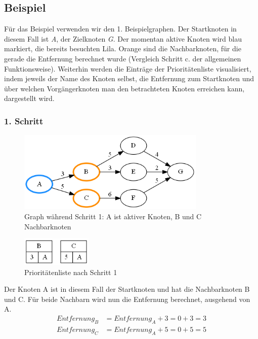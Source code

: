 \documentclass[11pt]{scrreprt}
\begin{document}
		\newpage
		\subsection{Beispiel}
		Für das Beispiel verwenden wir den 1. Beispielgraphen. Der Startknoten in diesem Fall ist \textit{A}, der Zielknoten \textit{G}. Der momentan aktive Knoten wird blau markiert, die bereits besuchten Lila. Orange sind die Nachbarknoten, für die gerade die Entfernung berechnet wurde (Vergleich Schritt c. der allgemeinen Funktionsweise).
		Weiterhin werden die Einträge der Prioritätenliste visualisiert, indem jeweils der Name des Knoten selbst, die Entfernung zum Startknoten und über welchen Vorgängerknoten man den betrachteten Knoten erreichen kann, dargestellt wird.
			\subsubsection{1. Schritt}
			\begin{figure}[ht]
				\centering
				\includegraphics[width=0.8\textwidth]{Graphs/Example1}
				\caption{Graph während Schritt 1: A ist aktiver Knoten, B und C Nachbarknoten}
			\end{figure}
			\begin{figure}[ht!]
				\centering
				\includegraphics[width=0.3\textwidth]{Graphs/Example1_PQ}
				\caption{Prioritätenliste nach Schritt 1}
			\end{figure}
			Der Knoten A ist in diesem Fall der Startknoten und hat die Nachbarknoten B und C.
			Für beide Nachbarn wird nun die Entfernung berechnet, ausgehend von A.
			\begin{align*}
					Entfernung_B &= Entfernung_A + 3 = 0 + 3 = 3\\
					Entfernung_C &= Entfernung_A + 5 = 0 + 5 = 5
			\end{align*}
			
\end{document}
